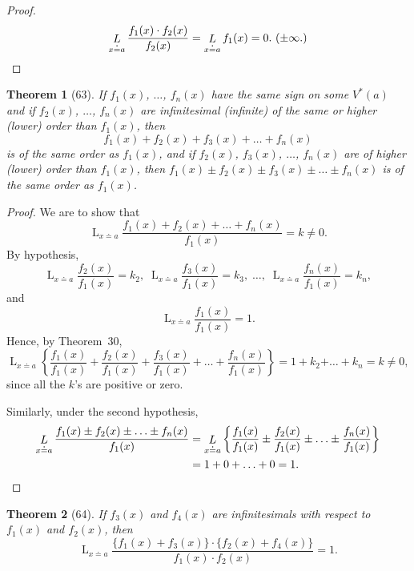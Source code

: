 \documentclass[a4paper,12pt]{book}[2004/02/16]
\providecommand{\colorbox}[2]{#2}
\newcommand{\correction}[2]{\colorbox{corr}{#1}}
\providecommand{\hyperlink}[2]{#2}
\providecommand{\hypertarget}[2]{#2}
\theoremstyle{ilemma}
\theoremstyle{itheorem}
\newtheorem{theorem}{Theorem}
\theoremstyle{iother}
\theoremstyle{icorollary}
\theoremstyle{numcorollary}
\theoremstyle{idefinition}
\begin{document}
\begin{proof}
\[
  \mathop{L}_{x \doteq a} \frac{f_1(x) \cdot f_2(x)}{f_2(x)} =
  \mathop{L}_{x \doteq a} f_1(x) = 0.\ (\pm \infty.)\qedhere
\]
\end{proof}

\begin{theorem}[63]\hypertarget{thm63}{}
If $f_1(x)$, $\ldots$, $f_n(x)$ have the same sign on some $V^*(a)$
and if $f_2(x)$, $\ldots$, $f_n(x)$ are infinitesimal (infinite) of
the same or higher (lower) order than $f_1(x)$, then
\[
  f_1(x) + f_2(x) + f_3(x) + \ldots + f_n(x)
\]
is of the same order as $f_1(x)$, and if $f_2(x)$, $f_3(x)$, $\ldots$,
$f_n(x)$ are of higher (lower) order than $f_1(x)$, then $f_1(x) \pm
f_2(x) \pm f_3(x) \pm \ldots \pm f_n(x)$ is of the same order as
$f_1(x)$.
\end{theorem}

\begin{proof}
We are to show that
\[
  \mathop{L}_{x \doteq a} \frac{f_1(x) + f_2(x) + \ldots +
  f_n(x)}{f_1(x)} = k \neq 0.
\]
By hypothesis,
\[
  \mathop{L}_{x \doteq a} \frac{f_2(x)}{f_1(x)} = k_2, \;
  \mathop{L}_{x \doteq a} \frac{f_3(x)}{f_1(x)} = k_3, \;
  \ldots, \;
  \mathop{L}_{x \doteq a} \frac{f_n(x)}{f_1(x)} = k_n,
\]
and
\[
  \mathop{L}_{x \doteq a} \frac{f_1(x)}{f_1(x)} = 1.
\]
Hence, by Theorem~\hyperlink{thm30}{30},
\[
  \mathop{L}_{x \doteq a} \left\{%
  \frac{f_1(x)}{f_1(x)} +
  \frac{f_2(x)}{f_1(x)} +
  \frac{f_3(x)}{f_1(x)} +
  \ldots +
  \frac{f_n(x)}{f_1(x)} \right\} =
  1 + k_2 \text{\correction{$+\ldots+$}{$\ldots$}} k_n = k \neq 0,
\]
since all the $k$'s are positive or zero.

Similarly, under the second hypothesis,
\begin{align*}
  \mathop{L}_{x \doteq a} \frac{f_1(x) \pm f_2(x) \pm \ldots \pm
  f_n(x)}{f_1(x)}
  & = \mathop{L}_{x \doteq a} \left\{%
  \frac{f_1(x)}{f_1(x)} \pm \frac{f_2(x)}{f_1(x)} \pm \ldots \pm
  \frac{f_n(x)}{f_1(x)} \right\}\\
  & = 1 + 0 + \ldots + 0 = 1.\qedhere
\end{align*}
\end{proof}

\begin{theorem}[64]\hypertarget{thm64}{}
If $f_3(x)$ and $f_4(x)$ are infinitesimals with respect to $f_1(x)$
and $f_2(x)$, then
\[
  \mathop{L}_{x \doteq a}
  \frac{\{f_1(x) + f_3(x)\} \cdot \{f_2(x) + f_4(x)\}}{f_1(x)\cdot f_2(x)}=1.
\]
\end{theorem}
\end{document}
